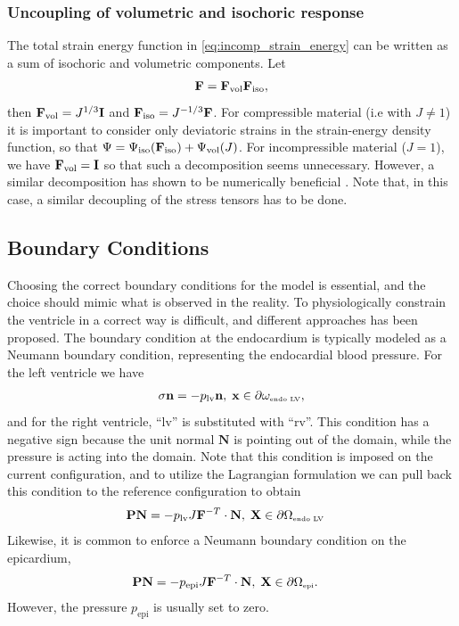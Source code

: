 \subsubsection{Uncoupling of volumetric and isochoric response}
The total strain energy function in \eqref{eq:incomp_strain_energy}
can be written as a sum of isochoric and volumetric components. Let
\begin{align}
  \mathbf{F} =  \mathbf{F}_{\mathrm{vol}} \mathbf{F}_{\mathrm{iso}},
\end{align}
then $ \mathbf{F}_{\mathrm{vol}} =
J^{1/3}\mathbf{I}$ and $\mathbf{F}_{\mathrm{iso}} = J^{-1/3}\mathbf{F}$. For
compressible material (i.e with $J \neq 1$) it is important to consider
only deviatoric strains in the strain-energy density function, so that
$\Psi = \Psi_{\mathrm{iso}}(\mathbf{F}_{\mathrm{iso}}) +
\Psi_{\mathrm{vol}}(J)$. For incompressible material ($J = 1$), we
have $\mathbf{F}_{\mathrm{vol}} = \mathbf{I}$ so that such a decomposition seems
unnecessary. However, a similar decomposition has shown to be
numerically beneficial \cite{weiss1996finite}. Note that, in this case, a similar
decoupling of the stress tensors has to be done.

\subsection{Boundary Conditions}
\label{sec:mech_boudary}


Choosing the correct boundary conditions for the model is essential,
and the choice should mimic what is observed in the reality. To
physiologically constrain the ventricle in a correct way is difficult,
and different approaches has been proposed.
The boundary condition at the endocardium is typically modeled as a
Neumann boundary condition, representing the endocardial blood
pressure. For the left ventricle we have
\begin{align}
  \sigma \mathbf{n} = -p_{\mathrm{lv}} \mathbf{n}, \;  \mathbf{x} \in  \partial \omega_{ \textnormal{\tiny \text{endo LV}}}, 
\end{align}
and for the right ventricle, ``lv'' is substituted with ``rv''.
This condition has a negative sign because the unit normal
$\mathbf{N}$ is pointing out of the domain, while the pressure is
acting into the domain. 
Note that this condition is imposed on the current configuration, and
to utilize the Lagrangian formulation we can pull back this condition
to the reference configuration to obtain
\begin{align}
  \mathbf{P}\mathbf{N} &= -p_{\mathrm{lv}} J\mathbf{F}^{-T} \cdot \mathbf{N}, \;  \mathbf{X} \in \partial \Omega_{ \textnormal{\tiny \text{endo LV}}}
\end{align}
Likewise, it is common to enforce a
Neumann boundary condition on the epicardium,
\begin{align}
\mathbf{P}\mathbf{N}  &= -p_{\mathrm{epi}}  J\mathbf{F}^{-T} \cdot \mathbf{N}, \;  \mathbf{X} \in \partial \Omega_{ \textnormal{\tiny \text{epi}}}.
\end{align}
However, the pressure $p_{\mathrm{epi}}$ is usually set
to zero.

